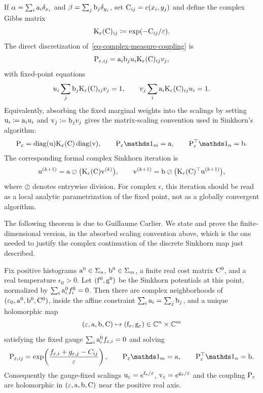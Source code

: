 If $\al=\sum_i \a_i\delta_{x_i}$ and $\be=\sum_j \b_j\delta_{y_j}$, set $\C_{ij}=c(x_i,y_j)$ and define the complex Gibbs matrix
\[
	\K_\epsilon(\C)_{ij}\eqdef \exp(-\C_{ij}/\epsilon).
\]
The direct discretization of~\eqref{eq-complex-measure-coupling} is
\[
	\P_{\epsilon,ij}=\a_i\b_j u_i\K_\epsilon(\C)_{ij}v_j,
\]
with fixed-point equations
\[
	u_i\sum_j \b_j\K_\epsilon(\C)_{ij}v_j=1,
	\qquad
	v_j\sum_i \a_i\K_\epsilon(\C)_{ij}u_i=1 .
\]
Equivalently, absorbing the fixed marginal weights into the scalings by setting
$\uD_i\eqdef \a_i u_i$ and $\vD_j\eqdef \b_j v_j$ gives the matrix-scaling convention used in Sinkhorn's algorithm:
\[
	\P_\epsilon
	=
	\diag(\uD)\K_\epsilon(\C)\diag(\vD),
	\qquad
	\P_\epsilon\ones_m=\a,
	\qquad
	\P_\epsilon^\top\ones_n=\b .
\]
The corresponding formal complex Sinkhorn iteration is
\begin{equation}\label{eq-complex-sinkhorn-iteration}
	\uD^{(k+1)}
	=
	\a \oslash \bigl(\K_\epsilon(\C)\vD^{(k)}\bigr),
	\qquad
	\vD^{(k+1)}
	=
	\b \oslash \bigl(\K_\epsilon(\C)^\top\uD^{(k+1)}\bigr),
\end{equation}
where $\oslash$ denotes entrywise division. For complex $\epsilon$, this iteration should be read as a local analytic parametrization of the fixed point, not as a globally convergent algorithm.

The following theorem is due to Guillaume Carlier. We state and prove the finite-dimensional version, in the absorbed scaling convention above, which is the one needed to justify the complex continuation of the discrete Sinkhorn map just described.

\begin{thm}\label{thm-carlier-complex-sinkhorn}
	Fix positive histograms $\a^0\in\simplex_n$, $\b^0\in\simplex_m$, a finite real cost matrix $\C^0$, and a real temperature $\epsilon_0>0$. Let $(\fD^0,\gD^0)$ be the Sinkhorn potentials at this point, normalized by $\sum_i \a_i^0 f_i^0=0$. Then there are complex neighborhoods of $(\epsilon_0,\a^0,\b^0,\C^0)$, inside the affine constraint $\sum_i \a_i=\sum_j \b_j$, and a unique holomorphic map
	\[
		(\epsilon,\a,\b,\C)\mapsto(\fD_\epsilon,\gD_\epsilon)\in\CC^n\times\CC^m
	\]
	satisfying the fixed gauge $\sum_i \a_i^0 f_{\epsilon,i}=0$ and solving
	\[
		\P_{\epsilon,ij}
		=
		\exp\!\left(\frac{f_{\epsilon,i}+g_{\epsilon,j}-C_{ij}}{\epsilon}\right),
		\qquad
		\P_\epsilon\ones_m=\a,
		\qquad
		\P_\epsilon^\top\ones_n=\b .
	\]
	Consequently the gauge-fixed scalings $\uD_\epsilon=e^{\fD_\epsilon/\epsilon}$, $\vD_\epsilon=e^{\gD_\epsilon/\epsilon}$ and the coupling $\P_\epsilon$ are holomorphic in $(\epsilon,\a,\b,\C)$ near the positive real axis.
\end{thm}

